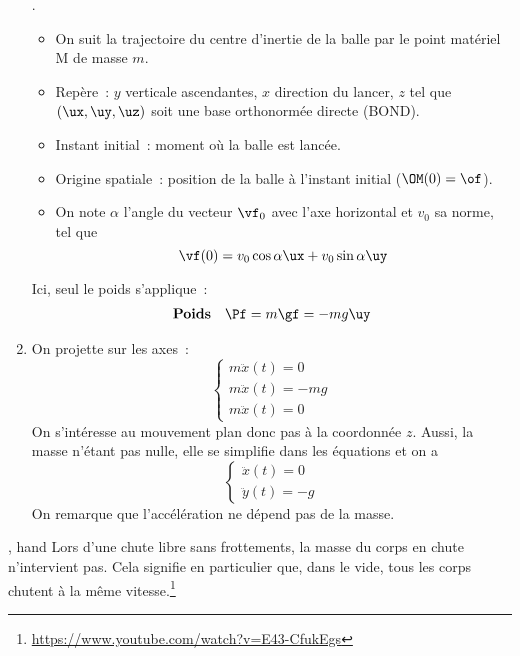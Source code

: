 \documentclass[../main/main.tex]{subfiles}
\begin{document}
\begin{enumerate}[label=\sqenumi, start=3]
    .
        \begin{itemize}
            \item On suit la trajectoire du centre d'inertie de la balle par le
                point matériel M de masse $m$.
            \item Repère~: $y$ verticale ascendantes, $x$ direction du lancer,
                $z$ tel que $(\ux, \uy, \uz)$ soit une base orthonormée directe
                (BOND).
            \item Instant initial~: moment où la balle est lancée.
            \item Origine spatiale~: position de la balle à l'instant initial
                ($\OM(0) = \of$).
            \item On note $\alpha$ l'angle du vecteur $\vf_0$ avec l'axe
                horizontal et $v_0$ sa norme, tel que
                \[\vf(0) = v_0\cos\alpha\ux + v_0\sin\alpha\uy\]
        \end{itemize}
     Ici, seul le poids s'applique~:
        \[
            \begin{array}{ll}
                \textbf{Poids} & \Pf = m\gf = -mg\uy
            \end{array}
        \]
    \item {}
     On projette sur les axes~:
        \[
            \left\{
                \begin{array}{l}
                    m\ddot{x}(t) = 0\\
                    m\ddot{x}(t) = -mg\\
                    m\ddot{x}(t) = 0
                \end{array}
            \right.
        \]
        On s'intéresse au mouvement plan donc pas à la coordonnée $z$. Aussi, la
        masse n'étant pas nulle, elle se simplifie dans les équations et on a
        \[
            \left\{ 
                \begin{array}{l}
                    \ddot{x}(t) = 0\\
                    \ddot{y}(t) = -g
                \end{array}
            \right.
        \]
        On remarque que l'accélération ne dépend pas de la masse.
\end{enumerate}
\begin{tror}{, hand}
    Lors d’une chute libre sans frottements, la masse du corps en chute
    n’intervient pas. Cela signifie en particulier que, dans le vide, tous les
    corps chutent à la même
    vitesse.\footnote{\url{https://www.youtube.com/watch?v=E43-CfukEgs}}
\end{tror}
\end{document}
